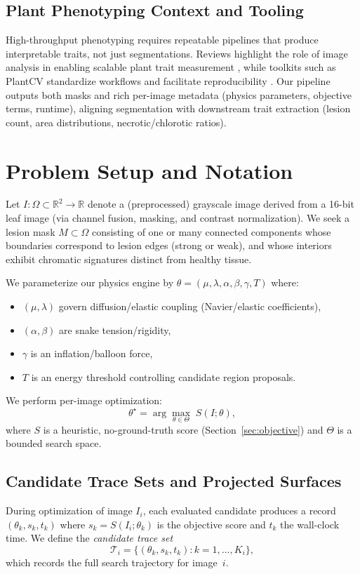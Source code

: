 \documentclass[journal]{IEEEtran}
\newcommand{\R}{\mathbb{R}}
\begin{document}
\subsection{Plant Phenotyping Context and Tooling}
High-throughput phenotyping requires repeatable pipelines that produce interpretable traits, not just segmentations. Reviews highlight the role of image analysis in enabling scalable plant trait measurement \cite{gehan2017high}, while toolkits such as PlantCV standardize workflows and facilitate reproducibility \cite{plantcv2025}. Our pipeline outputs both masks and rich per-image metadata (physics parameters, objective terms, runtime), aligning segmentation with downstream trait extraction (lesion count, area distributions, necrotic/chlorotic ratios).

\section{Problem Setup and Notation}
Let $I:\Omega\subset\R^2\rightarrow\R$ denote a (preprocessed) grayscale image derived from a 16-bit leaf image (via channel fusion, masking, and contrast normalization). We seek a lesion mask $M\subset\Omega$ consisting of one or many connected components whose boundaries correspond to lesion edges (strong or weak), and whose interiors exhibit chromatic signatures distinct from healthy tissue.

We parameterize our physics engine by $\theta = (\mu,\lambda,\alpha,\beta,\gamma,T)$ where:
\begin{itemize}
    \item $(\mu,\lambda)$ govern diffusion/elastic coupling (Navier/elastic coefficients),
    \item $(\alpha,\beta)$ are snake tension/rigidity,
    \item $\gamma$ is an inflation/balloon force,
    \item $T$ is an energy threshold controlling candidate region proposals.
\end{itemize}
We perform per-image optimization:
\begin{equation}
\theta^\star = \arg\max_{\theta \in \Theta} \; S(I;\theta),
\end{equation}
where $S$ is a heuristic, no-ground-truth score (Section~\ref{sec:objective}) and $\Theta$ is a bounded search space.

\subsection{Candidate Trace Sets and Projected Surfaces}
\label{sec:trace_surfaces}
During optimization of image $I_i$, each evaluated candidate produces a record $({\theta}_k, s_k, t_k)$ where $s_k = S(I_i; {\theta}_k)$ is the objective score and $t_k$ the wall-clock time.
We define the \emph{candidate trace set}
\begin{equation}
\mathcal{T}_i = \bigl\{({\theta}_k, s_k, t_k) : k = 1, \dots, K_i\bigr\},
\label{eq:trace_set}
\end{equation}
which records the full search trajectory for image~$i$.
\end{document}
